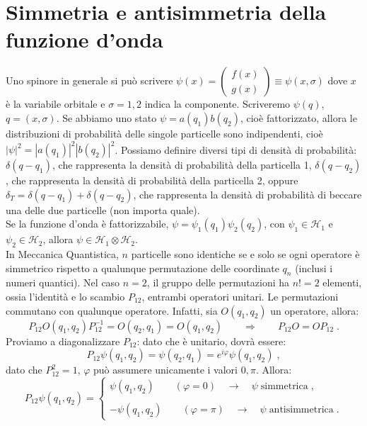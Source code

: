 \documentclass[10pt,a4paper]{report}
\theoremstyle{definition}
\newcommand{\ham}{\mathcal{H}}
\numberwithin{equation}{section}
\begin{document}
\section{Simmetria e antisimmetria della funzione d'onda}
Uno spinore in generale si può scrivere $\psi(x)=\left(\begin{matrix}
f(x) \\
g(x)
\end{matrix}\right)\equiv \psi(x,\sigma)$ dove $x$ è la variabile orbitale e $\sigma=1,2$ indica la componente. Scriveremo $\psi(q)$, $q=(x,\sigma)$. Se abbiamo uno stato $\psi=a(q_1)b(q_2)$, cioè fattorizzato, allora le distribuzioni di probabilità delle singole particelle sono indipendenti, cioè $|\psi|^2=|a(q_1)|^2|b(q_2)|^2$. Possiamo definire diversi tipi di densità di probabilità: $\delta(q-q_1)$, che rappresenta la densità di probabilità della particella 1, $\delta(q-q_2)$, che rappresenta la densità di probabilità della particella 2, oppure $\delta_T=\delta(q-q_1)+\delta(q-q_2)$, che rappresenta la densità di probabilità di beccare una delle due particelle (non importa quale). \\
Se la funzione d'onda è fattorizzabile, $\psi=\psi_1(q_1)\psi_2(q_2)$, con $\psi_1\in\ham_1$ e $\psi_2\in\ham_2$, allora $\psi\in \ham_1\otimes\ham_2$. \\
In Meccanica Quantistica, $n$ particelle sono identiche se e solo se ogni operatore è simmetrico rispetto a qualunque permutazione delle coordinate $q_n$ (inclusi i numeri quantici). Nel caso $n=2$, il gruppo delle permutazioni ha $n!=2$ elementi, ossia l'identità e lo scambio $P_{12}$, entrambi operatori unitari. Le permutazioni commutano con qualunque operatore. Infatti, sia $O(q_1,q_2)$ un operatore, allora:
\begin{equation}
P_{12}O(q_1,q_2)P_{12}^{-1}=O(q_2,q_1)=O(q_1,q_2)\qquad \Longrightarrow \qquad P_{12}O=OP_{12}\;.
\end{equation}
Proviamo a diagonalizzare $P_{12}$: dato che è unitario, dovrà essere:
\begin{equation}
P_{12}\psi(q_1,q_2)=\psi(q_2,q_1)=e^{i\varphi}\psi(q_1,q_2)\;,
\end{equation}
dato che $P_{12}^2=1$, $\varphi$ può assumere unicamente i valori $0,\pi$. Allora:
\begin{equation}
P_{12}\psi(q_1,q_2)=\begin{cases}
\psi(q_1,q_2)\qquad (\varphi=0)\quad\longrightarrow\quad\psi\;\mbox{simmetrica}\;, \\
\\
-\psi(q_1,q_2)\qquad (\varphi=\pi)\quad\longrightarrow\quad\psi\;\mbox{antisimmetrica}\;.
\end{cases}
\end{equation}
\end{document}
